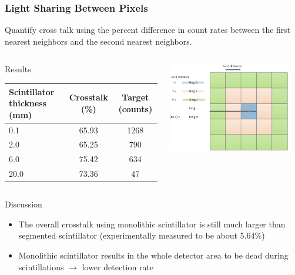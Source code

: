 \documentclass[xcolor=x11names, compress, handout]{beamer}
\renewcommand{\(}{\begin{columns}}
\renewcommand{\)}{\end{columns}}
\newcommand{\<}[1]{\begin{column}{#1}}
\renewcommand{\>}{\end{column}}
\begin{document}
\begin{frame}
\frametitle{Light Sharing Between Pixels}
\scriptsize
Quantify cross talk using the percent difference in count rates between the first nearest neighbors and the second nearest neighbors.
\begin{columns}
\begin{column}{0.6\textwidth}
\begin{block}{Results}
\centering
\begin{tabular}{p{2cm} | c c}
Scintillator thickness (mm) & Crosstalk (\%) & Target (counts) \\
\hline
0.1 & 65.93 & 1268 \\
2.0 & 65.25 & 790 \\
6.0 & 75.42  & 634 \\
20.0 & 73.36 & 47 \\
\end{tabular}
\end{block}
\end{column}
\begin{column}{0.35\textwidth}
\includegraphics[width=0.9\textwidth]{images/knn.png}
\end{column}
\end{columns}

\begin{block}{Discussion}
\begin{itemize}
\item The overall crosstalk using monolithic scintillator is still much larger than segmented scintillator (experimentally measured to be about 5.64\%)
\item Monolithic scintillator results in the whole detector area to be dead during scintillations $\rightarrow$ lower detection rate
\end{itemize}
\end{block}
\end{frame}
\end{document}
